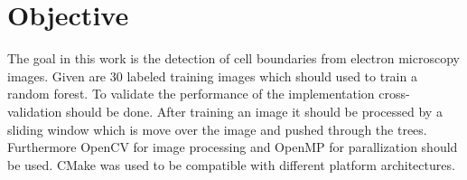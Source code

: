 \section{Objective}
\label{sec:objective}

The goal in this work is the detection of cell boundaries from electron microscopy images. Given are 30 labeled training images which should used to train a random forest.
To validate the performance of the implementation cross-validation should be done.
After training an image it should be processed by a sliding window which is move over the image and pushed through the trees.
Furthermore OpenCV for image processing and OpenMP for parallization should be used. CMake was used to be compatible with different platform architectures.